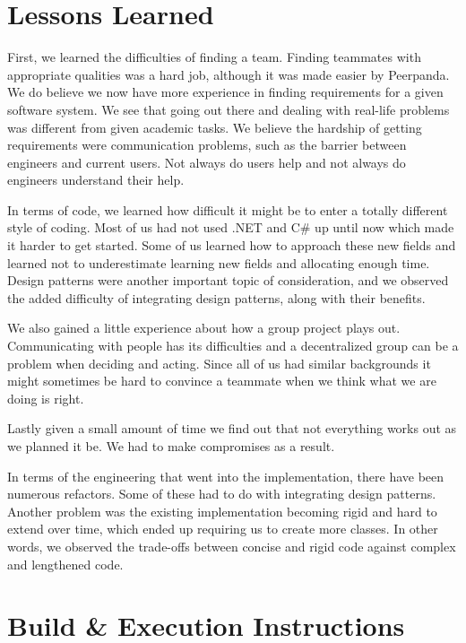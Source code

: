 \documentclass[a4paper, 12pt, titlepage]{article}
\begin{document}
  \section{Lessons Learned}
  
  First, we learned the difficulties of finding a team. 
  Finding teammates with appropriate qualities was a hard job, although it was made easier by Peerpanda. 
  We do believe we now have more experience in finding requirements for a given software system. 
  We see that going out there and dealing with real-life problems was different from given academic tasks. 
  We believe the hardship of getting requirements were communication problems, 
  such as the barrier between engineers and current users. 
  Not always do users help and not always do engineers understand their help.

  In terms of code, we learned how difficult it might be to enter a totally different style of coding. 
  Most of us had not used .NET and C\# up until now which made it harder to get started. 
  Some of us learned how to approach these new fields and learned not to underestimate learning new fields and allocating enough time.
  Design patterns were another important topic of consideration, 
  and we observed the added difficulty of integrating design patterns,
  along with their benefits.

  We also gained a little experience about how a group project plays out. 
  Communicating with people has its difficulties and a decentralized group can be a problem when deciding and acting. 
  Since all of us had similar backgrounds it might sometimes be hard to convince a teammate when we think what we are doing is right.
  
  Lastly given a small amount of time we find out that not everything works out as we planned it be. 
  We had to make compromises as a result.
  
  In terms of the engineering that went into the implementation, there have been numerous refactors.
  Some of these had to do with integrating design patterns.
  Another problem was the existing implementation becoming rigid and hard to extend over time,
  which ended up requiring us to create more classes.
  In other words, we observed the trade-offs between concise and rigid code against complex and lengthened code.
  
  \pagebreak
  \section{Build \& Execution Instructions}
  
\end{document}
